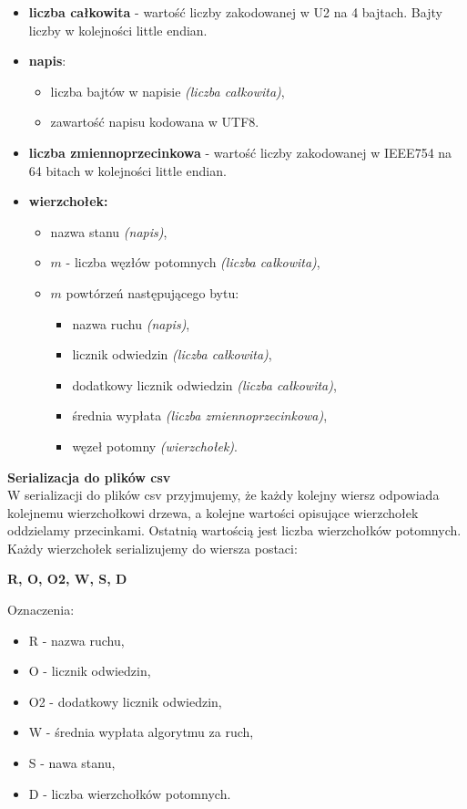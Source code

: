 \documentclass{article}
\begin{document}
	\begin{itemize}
		\item \textbf{liczba całkowita} - wartość liczby zakodowanej w U2 na 4 bajtach. Bajty liczby w kolejności little endian.
		\item \textbf{napis}:
		\begin{itemize}
			\item liczba bajtów w napisie \textit{(liczba całkowita)},
			\item zawartość napisu kodowana w UTF8.
		\end{itemize}
		\item \textbf{liczba zmiennoprzecinkowa} - wartość liczby zakodowanej w IEEE754 na 64 bitach w kolejności little endian.
		\item \textbf{wierzchołek:}
		\begin{itemize}
			\item nazwa stanu \textit{(napis)},
			\item $m$ - liczba węzłów potomnych \textit{(liczba całkowita)},
			\item $m$ powtórzeń następującego bytu:
			\begin{itemize}
				\item nazwa ruchu \textit{(napis)},
				\item licznik odwiedzin \textit{(liczba całkowita)},
				\item dodatkowy licznik odwiedzin \textit{(liczba całkowita)},
				\item średnia wypłata \textit{(liczba zmiennoprzecinkowa)},
				\item węzeł potomny \textit{(wierzchołek)}. \\
			\end{itemize}
		\end{itemize}
	\end{itemize}
	
	
	\noindent \textbf{\large Serializacja do plików csv} \\
	W serializacji do plików csv przyjmujemy, że każdy kolejny wiersz odpowiada kolejnemu wierzchołkowi drzewa, a kolejne wartości opisujące wierzchołek oddzielamy przecinkami. Ostatnią wartością jest liczba wierzchołków potomnych. Każdy wierzchołek serializujemy do wiersza postaci:
	
	\begin{center}
		\textbf{R, O, O2, W, S, D}
	\end{center}
	Oznaczenia:
	\begin{itemize}
		\item R - nazwa ruchu,
		\item O - licznik odwiedzin,
		\item O2 - dodatkowy licznik odwiedzin,
		\item W - średnia wypłata algorytmu za ruch,
		\item S - nawa stanu,
		\item D - liczba wierzchołków potomnych.\\
	\end{itemize}
\end{document}
